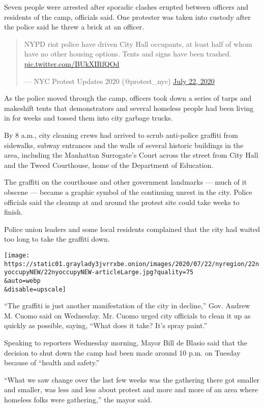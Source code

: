 Seven people were arrested after sporadic clashes erupted between
officers and residents of the camp, officials said. One protester was
taken into custody after the police said he threw a brick at an officer.

\begin{quote}
NYPD riot police have driven City Hall occupants, at least half of whom
have no other housing options. Tents and signs have been trashed.
\href{https://t.co/BUkXIRfQOd}{pic.twitter.com/BUkXIRfQOd}

--- NYC Protest Updates 2020 (@protest\_nyc)
\href{https://twitter.com/protest_nyc/status/1285846628012896258?ref_src=twsrc\%5Etfw}{July
22, 2020}
\end{quote}

As the police moved through the camp, officers took down a series of
tarps and makeshift tents that demonstrators and several homeless people
had been living in for weeks and tossed them into city garbage trucks.

By 8 a.m., city cleaning crews had arrived to scrub anti-police graffiti
from sidewalks, subway entrances and the walls of several historic
buildings in the area, including the Manhattan Surrogate's Court across
the street from City Hall and the Tweed Courthouse, home of the
Department of Education.

The graffiti on the courthouse and other government landmarks --- much
of it obscene --- became a graphic symbol of the continuing unrest in
the city. Police officials said the cleanup at and around the protest
site could take weeks to finish.

Police union leaders and some local residents complained that the city
had waited too long to take the graffiti down.

\texttt{[image: https://static01.graylady3jvrrxbe.onion/images/2020/07/22/nyregion/22nyoccupyNEW/22nyoccupyNEW-articleLarge.jpg?quality=75\\\&auto=webp\\\&disable=upscale]}

``The graffiti is just another manifestation of the city in decline,''
Gov. Andrew M. Cuomo said on Wednesday. Mr. Cuomo urged city officials
to clean it up as quickly as possible, saying, ``What does it take? It's
spray paint.''

Speaking to reporters Wednesday morning, Mayor Bill de Blasio said that
the decision to shut down the camp had been made around 10 p.m. on
Tuesday because of ``health and safety.''

``What we saw change over the last few weeks was the gathering there got
smaller and smaller, was less and less about protest and more and more
of an area where homeless folks were gathering,'' the mayor said.

